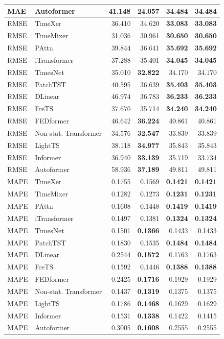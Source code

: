 \begin{longtable}{llrrrr}
MAE & Autoformer & 41.148 & \textbf{24.057} & 34.484 & 34.484 \\
\midrule
RMSE & TimeXer & 36.410 & 34.620 & \textbf{33.083} & \textbf{33.083} \\
RMSE & TimeMixer & 31.036 & 30.961 & \textbf{30.650} & \textbf{30.650} \\
RMSE & PAttn & 39.844 & 36.641 & \textbf{35.692} & \textbf{35.692} \\
RMSE & iTransformer & 37.288 & 35.401 & \textbf{34.045} & \textbf{34.045} \\
RMSE & TimesNet & 35.010 & \textbf{32.822} & 34.170 & 34.170 \\
RMSE & PatchTST & 40.595 & 36.639 & \textbf{35.403} & \textbf{35.403} \\
RMSE & DLinear & 46.974 & 36.783 & \textbf{36.233} & \textbf{36.233} \\
RMSE & FreTS & 37.670 & 35.714 & \textbf{34.240} & \textbf{34.240} \\
RMSE & FEDformer & 46.642 & \textbf{36.224} & 40.861 & 40.861 \\
RMSE & Non-stat. Transformer & 34.576 & \textbf{32.547} & 33.839 & 33.839 \\
RMSE & LightTS & 38.118 & \textbf{34.977} & 35.843 & 35.843 \\
RMSE & Informer & 36.940 & \textbf{33.139} & 35.719 & 33.734 \\
RMSE & Autoformer & 58.936 & \textbf{37.189} & 49.811 & 49.811 \\
\midrule
MAPE & TimeXer & 0.1755 & 0.1569 & \textbf{0.1421} & \textbf{0.1421} \\
MAPE & TimeMixer & 0.1282 & 0.1273 & \textbf{0.1231} & \textbf{0.1231} \\
MAPE & PAttn & 0.1608 & 0.1448 & \textbf{0.1419} & \textbf{0.1419} \\
MAPE & iTransformer & 0.1497 & 0.1381 & \textbf{0.1324} & \textbf{0.1324} \\
MAPE & TimesNet & 0.1501 & \textbf{0.1366} & 0.1433 & 0.1433 \\
MAPE & PatchTST & 0.1830 & 0.1535 & \textbf{0.1484} & \textbf{0.1484} \\
MAPE & DLinear & 0.2544 & \textbf{0.1572} & 0.1763 & 0.1763 \\
MAPE & FreTS & 0.1592 & 0.1446 & \textbf{0.1388} & \textbf{0.1388} \\
MAPE & FEDformer & 0.2425 & \textbf{0.1716} & 0.1929 & 0.1929 \\
MAPE & Non-stat. Transformer & 0.1437 & \textbf{0.1319} & 0.1375 & 0.1375 \\
MAPE & LightTS & 0.1786 & \textbf{0.1468} & 0.1629 & 0.1629 \\
MAPE & Informer & 0.1531 & \textbf{0.1338} & 0.1422 & 0.1415 \\
MAPE & Autoformer & 0.3005 & \textbf{0.1608} & 0.2555 & 0.2555 \\
\end{longtable}
\endgroup

